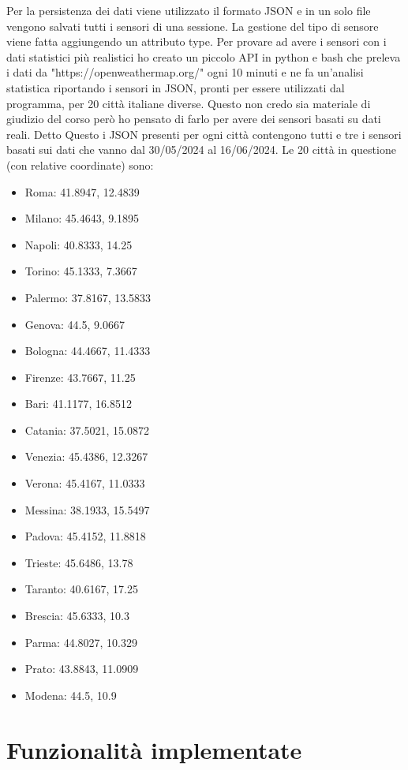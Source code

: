\documentclass{article}
\begin{document}
Per la persistenza dei dati viene utilizzato il formato JSON e in un solo file vengono salvati tutti i sensori di una sessione. La gestione del tipo di sensore viene fatta aggiungendo un attributo type.
Per provare ad avere i sensori con i dati statistici più realistici ho creato un piccolo API in python e bash che preleva i dati da "https://openweathermap.org/" ogni 10 minuti e ne fa un'analisi statistica riportando i sensori in JSON, pronti per essere utilizzati dal programma, per 20 città italiane diverse. Questo non credo sia materiale di giudizio del corso però ho pensato di farlo per avere dei sensori basati su dati reali. Detto Questo i JSON presenti per ogni città contengono tutti e tre i sensori basati sui dati che vanno dal 30/05/2024 al 16/06/2024. Le 20 città in questione (con relative coordinate) sono:
\begin{itemize}
\item Roma: 41.8947, 12.4839
\item Milano: 45.4643, 9.1895
\item Napoli: 40.8333, 14.25
\item Torino: 45.1333, 7.3667
\item Palermo: 37.8167, 13.5833
\item Genova: 44.5, 9.0667
\item Bologna: 44.4667, 11.4333
\item Firenze: 43.7667, 11.25
\item Bari: 41.1177, 16.8512
\item Catania: 37.5021, 15.0872
\item Venezia: 45.4386, 12.3267
\item Verona: 45.4167, 11.0333
\item Messina: 38.1933, 15.5497
\item Padova: 45.4152, 11.8818
\item Trieste: 45.6486, 13.78
\item Taranto: 40.6167, 17.25
\item Brescia: 45.6333, 10.3
\item Parma: 44.8027, 10.329
\item Prato: 43.8843, 11.0909
\item Modena: 44.5, 10.9
\end{itemize}

\section{Funzionalità implementate}
\end{document}
